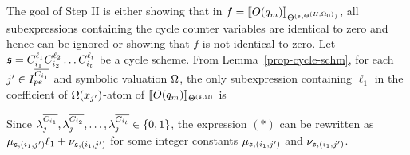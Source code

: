 The goal of Step II is either showing that in $f=\llbracket O(q_m)\rrbracket_{\Theta^{({\mathfrak{s} },\Theta^{(H,\Omega_0)})}}$, all subexpressions containing the cycle counter variables are identical to zero and hence can be ignored or showing that $f$ is not identical to zero. Let ${\mathfrak{s} }=C_{i_1}^{\ell_1} C_{i_2}^{\ell_2} \dots C_{i_t}^{\ell_t}$ be a cycle scheme. From Lemma~\ref{prop-cycle-schm}, for each $j'\in I^{\overline{C_{i_1}}}_{pe}$ and symbolic valuation $\Omega$, the only subexpression containing $\ell_1$ in the coefficient of $\Omega(x_{j'})$-atom of $\llbracket O(q_m)\rrbracket_{\Theta^{({\mathfrak{s} },\Omega)}}$ is
\begin{center}
\end{center}
Since $\lambda^{\overline{C_{i_1}}}_{j}, \lambda^{\overline{C_{i_2}}}_{j}, \dots, \lambda^{\overline{C_{i_t}}}_{j} \in \{0, 1\}$, the expression $(\ast)$  can be rewritten as  
 $\mu_{{\mathfrak{s} }, (i_1,j')} \ell_1 + \nu_{{\mathfrak{s} }, (i_1,j')}$ for some integer constants $\mu_{{\mathfrak{s} }, (i_1,j')}$ and $\nu_{{\mathfrak{s} }, (i_1,j')}$. 
 
